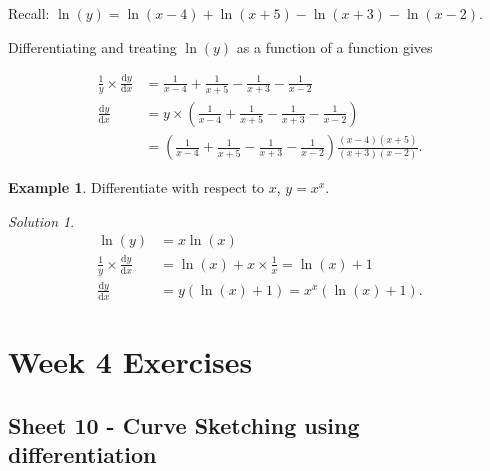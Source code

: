 \documentclass[
  11pt,
  oneside]{book}
\newcommand{\slide}{}
\theoremstyle{definition}
\theoremstyle{definition}
\newtheorem{example}{Example}[chapter]
\theoremstyle{definition}
\theoremstyle{definition}
\theoremstyle{remark}
\newtheorem*{solution}{Solution}
\begin{document}
\slide

\begin{slidesonly}

Recall: \(\ln(y) = \ln(x-4)+\ln(x+5)-\ln(x+3)-\ln(x-2)\).

\end{slidesonly}

Differentiating and treating \(\ln(y)\) as a function of a function gives

\begin{notslides}

\begin{align*}
\frac 1y\times\frac{\mathrm{d} y}{\mathrm{d} x} &= \frac{1}{x-4}+\frac{1}{x+5}-\frac{1}{x+3}-\frac{1}{x-2}\\
\frac{\mathrm{d} y}{\mathrm{d} x} &= y\times\left(\frac{1}{x-4}+\frac{1}{x+5}-\frac{1}{x+3}-\frac{1}{x-2}\right)\\
&= \left(\frac{1}{x-4}+\frac{1}{x+5}-\frac{1}{x+3}-\frac{1}{x-2}\right)\frac{(x-4)(x+5)}{(x+3)(x-2)}.
\end{align*}

\end{notslides}

\begin{slidesonly}

\slide

\end{slidesonly}

\begin{example}
Differentiate with respect to \(x\), \(y=x^x\).
\end{example}

\begin{solution}
\begin{align*}
\ln(y) &= x\ln(x)\\
\frac{1}{y}\times\frac{\mathrm{d} y}{\mathrm{d} x} &= \ln(x)+x\times\frac{1}{x} = \ln(x)+1\\
\frac{\mathrm{d} y}{\mathrm{d} x} &= y(\ln(x)+1) = x^x(\ln(x)+1).
\end{align*}
\end{solution}

\chapter*{Week 4 Exercises}\label{week-4-exercises}

\section{Sheet 10 - Curve Sketching using differentiation}\label{sheet-10---curve-sketching-using-differentiation}
\end{document}
